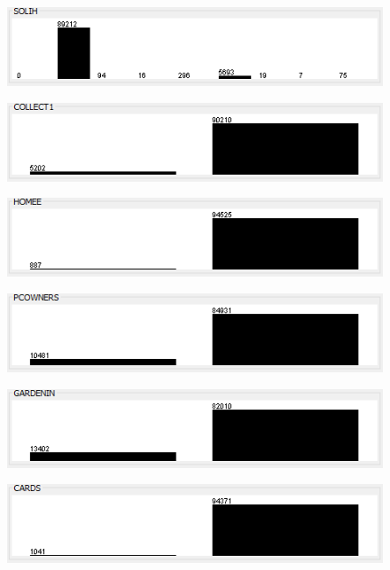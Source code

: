 \begin{figure}
\includegraphics{./images/expl_rep/Cattura2-03-02}
\end{figure}
\begin{figure}
\includegraphics{./images/expl_rep/Cattura2-03-03}
\end{figure}
\begin{figure}
\includegraphics{./images/expl_rep/Cattura2-03-04}
\end{figure}
\begin{figure}
\includegraphics{./images/expl_rep/Cattura2-03-05}
\end{figure}
\begin{figure}
\includegraphics{./images/expl_rep/Cattura2-03-06}
\end{figure}
\begin{figure}
\includegraphics{./images/expl_rep/Cattura2-03-07}
\end{figure}
